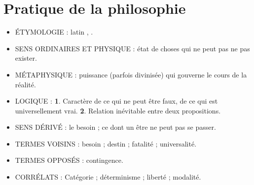 
\section{Pratique de la philosophie}

{\bf }

\begin{itemize}[leftmargin=1cm, label=, itemsep=1pt]
\item {\footnotesize ÉTYMOLOGIE} : latin {\it }, .
\item {\footnotesize SENS ORDINAIRES ET PHYSIQUE} : état de choses qui ne peut pas ne pas exister.
\item {\footnotesize MÉTAPHYSIQUE} : puissance (parfois divinisée) qui gouverne le cours
de la réalité.
\item {\footnotesize LOGIQUE} : {\bf 1}. Caractère de ce qui ne peut être faux, de
ce qui est universellement vrai. {\bf 2}. Relation inévitable entre deux propositions.
\item {\footnotesize SENS DÉRIVÉ} : le besoin ; ce dont un être ne peut pas
se passer.
\end{itemize}

\begin{itemize}[leftmargin=1cm, label=, itemsep=1pt]
\item {\footnotesize TERMES VOISINS} : besoin ; destin ; fatalité ; universalité.
\item {\footnotesize TERMES OPPOSÉS} : contingence.
\item {\footnotesize CORRÉLATS} : Catégorie ; déterminisme ; liberté ; modalité.
\end{itemize}

